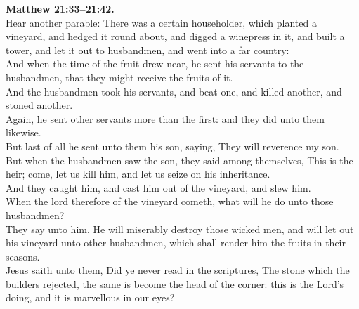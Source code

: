 \documentclass[10pt]{article} %
\begin{document}
{\begin{minipage}[t]{0.45\textwidth}
\textbf{Matthew 21:33--21:42.}\\
Hear another parable: There was a certain householder, which planted a vineyard, and hedged it round about, and digged a winepress in it, and built a tower, and let it out to husbandmen, and went into a far country:\\
And when the time of the fruit drew near, he sent his servants to the husbandmen, that they might receive the fruits of it.\\
And the husbandmen took his servants, and beat one, and killed another, and stoned another.\\
Again, he sent other servants more than the first: and they did unto them likewise.\\
But last of all he sent unto them his son, saying, They will reverence my son.\\
But when the husbandmen saw the son, they said among themselves, This is the heir; come, let us kill him, and let us seize on his inheritance.\\
And they caught him, and cast him out of the vineyard, and slew him.\\
When the lord therefore of the vineyard cometh, what will he do unto those husbandmen?\\
They say unto him, He will miserably destroy those wicked men, and will let out his vineyard unto other husbandmen, which shall render him the fruits in their seasons.\\
Jesus saith unto them, Did ye never read in the scriptures, The stone which the builders rejected, the same is become the head of the corner: this is the Lord's doing, and it is marvellous in our eyes?\\

\end{minipage}}
\vspace*{\fill}
\newpage
\Huge%
\vspace*{\fill}
\end{document}
